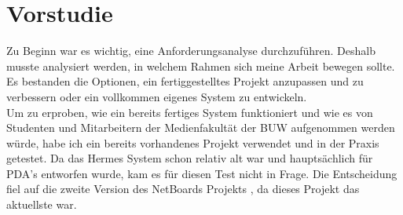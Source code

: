\chapter{Vorstudie}\label{Vorstudie}
Zu Beginn war es wichtig, eine Anforderungsanalyse durchzuführen. Deshalb musste analysiert werden, in welchem Rahmen sich meine Arbeit bewegen sollte. Es bestanden die Optionen, ein fertiggestelltes Projekt anzupassen und zu verbessern oder ein vollkommen eigenes System zu entwickeln.
\\
Um zu erproben, wie ein bereits fertiges System funktioniert und wie es von Studenten und Mitarbeitern der Medienfakultät der BUW aufgenommen werden würde, habe ich ein bereits vorhandenes Projekt verwendet und in der Praxis getestet.
Da das Hermes System schon relativ alt war und hauptsächlich für PDA's entworfen wurde, kam es für diesen Test nicht in Frage.
Die Entscheidung fiel auf die zweite Version des NetBoards Projekts \cite{netboards:website}, da dieses Projekt das aktuellste war.
